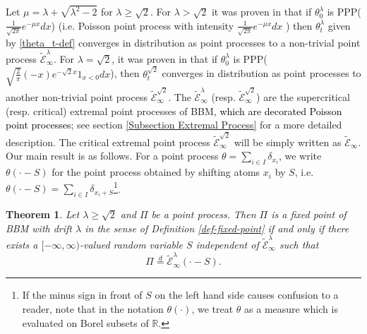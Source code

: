 \documentclass[a4paper,reqno]{amsart}%
\newcommand{\1}{\mathbf 1}
\theoremstyle{mine}
\newtheorem{theorem}{Theorem}
\numberwithin{theorem}{section}
\numberwithin{equation}{section}
\theoremstyle{remark}
\begin{document}
Let $\mu = \lambda + \sqrt{\lambda^2 -2}$ for $\lambda \geq \sqrt{2}$. For $\lambda >\sqrt{2}$ it was proven in \cite{Kabluchko} that if $\theta_0^\lambda$ is PPP($\frac{1}{\sqrt{2\pi}}e^{-\mu x } dx$) (i.e. Poisson point process with intensity $\frac{1}{\sqrt{2\pi}}e^{-\mu x } dx$ ) then $\theta_t^\lambda$ given by \eqref{theta_t-def} converges in distribution as point processes to a non-trivial point process $\widetilde{\mathcal E}_\infty^\lambda$.
For $\lambda = \sqrt{2}$, it was proven in \cite{ABK13} that if $\theta_0^\lambda$ is PPP($\sqrt{\frac{2}{\pi}}(-x)e^{-\sqrt{2}x}1_{x < 0} dx$), then $\theta_t^{\sqrt{2}}$ converges in distribution as point processes to another non-trivial point process $ \widetilde{\mathcal E}_\infty^{\sqrt{2}}$. The $\widetilde{\mathcal E}_\infty^\lambda$ (resp. $ \widetilde{\mathcal E}_\infty^{\sqrt{2}}$) are the supercritical (resp. critical) extremal point processes of BBM, \textcolor{black}{which are decorated Poisson point processes}; see section \ref{Subsection Extremal Process} for a more detailed description. The critical extremal point process $\widetilde{\mathcal E}_\infty^{\sqrt{2}}$ will be simply written as $ \widetilde{\mathcal E}_\infty$. \\

Our main result is as follows. For a point process $\theta = \sum_{i \in I} \delta_{x_i}$, we write $\theta(\cdot - S)$ for the point process obtained by shifting atoms $x_i$ by $S$, i.e. $\theta(\cdot - S) = \sum_{i \in I} \delta_{x_i + S}$\footnote{If the minus sign in front of $S$ on the left hand side causes confusion to a reader, note that in the notation $\theta(\cdot)$, we treat $\theta$ as a measure which is evaluated on Borel subsets of $\mathbb{R}$.}.


\begin{theorem}\label{main-thm}
Let $\lambda \geq \sqrt{2}$ and $\Pi$ be a point process. Then $\Pi$ is a fixed point of BBM with drift $\lambda$ in the sense of Definition \ref{def-fixed-point} if and only if there exists a $[-\infty, \infty)$-valued random variable $S$ independent of $\widetilde{\mathcal E}_\infty^\lambda$ such that 
\[ \Pi \overset{d}{=} \widetilde{\mathcal E}_\infty^\lambda (\cdot - S). \]
\end{theorem}
\end{document}
